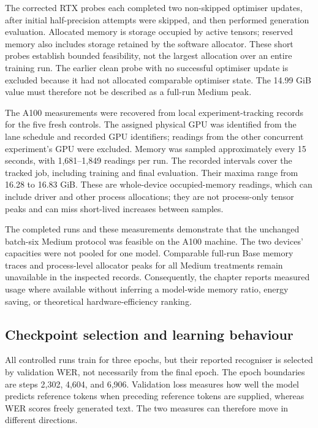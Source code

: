 \documentclass[12pt,a4paper]{report}
\begin{document}
The corrected RTX probes each completed two non-skipped optimiser updates,
after initial half-precision attempts were skipped, and then performed
generation evaluation. Allocated memory is storage occupied by active tensors;
reserved memory also includes storage retained by the software allocator.
These short probes establish bounded feasibility, not the largest allocation
over an entire training run. The earlier clean probe with no successful
optimiser update is excluded because it had not allocated comparable optimiser
state. The 14.99 GiB value must therefore not be described as a full-run
Medium peak.

The A100 measurements were recovered from local experiment-tracking records
for the five fresh controls. The assigned physical GPU was identified from
the lane schedule and recorded GPU identifiers; readings from the other
concurrent experiment's GPU were excluded. Memory was sampled approximately
every 15 seconds, with 1,681--1,849 readings per run. The recorded intervals
cover the tracked job, including training and final evaluation. Their maxima
range from 16.28 to 16.83 GiB. These are whole-device occupied-memory readings,
which can include driver and other process allocations; they are not
process-only tensor peaks and can miss short-lived increases between samples.

The completed runs and these measurements demonstrate that the unchanged
batch-six Medium protocol was feasible on the A100 machine. The two devices'
capacities were not pooled for one model. Comparable full-run Base memory
traces and process-level allocator peaks for all Medium treatments remain
unavailable in the inspected records. Consequently, the chapter reports
measured usage where available without inferring a model-wide memory ratio,
energy saving, or theoretical hardware-efficiency ranking.

\subsection{Checkpoint selection and learning behaviour}

All controlled runs train for three epochs, but their reported recogniser
is selected by validation WER, not necessarily from the final epoch.
The epoch boundaries are steps 2,302, 4,604, and 6,906. Validation loss
measures how well the model predicts reference tokens when preceding
reference tokens are supplied, whereas WER scores freely generated text.
The two measures can therefore move in different directions.
\end{document}
